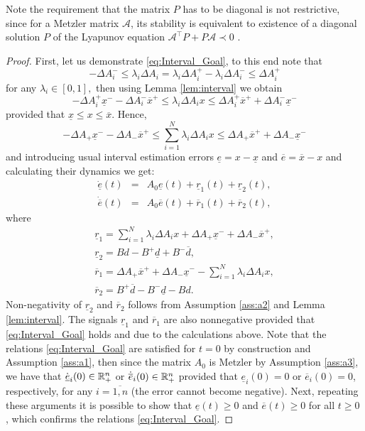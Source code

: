 \documentclass[letterpaper, 10 pt, conference]{ieeeconf}
\theoremstyle{plain}
\theoremstyle{definition}
\theoremstyle{plain}
\theoremstyle{plain}
\theoremstyle{remark}
\begin{document}
Note the requirement that the matrix $P$ has to be diagonal is not restrictive, since for a Metzler matrix $\mathcal{A}$, its stability is equivalent to existence of a diagonal solution $P$ of the Lyapunov equation $\mathcal{A}^{\top}P+P\mathcal{A}\prec0$ \cite{FarinaRinaldi2000}.
\begin{proof}
First, let us demonstrate \eqref{eq:Interval_Goal}, to this end note that
\[
-\Delta A_{i}^{-}\leq\lambda_{i}\Delta A_{i}=\lambda_{i}\Delta A_{i}^{+}-\lambda_{i}\Delta A_{i}^{-}\leq\Delta A_{i}^{+}
\]
for any $\lambda_{i}\in[0,1],$ then using Lemma \ref{lem:interval} we obtain
\[
-\Delta A_{i}^{+}\underline{x}^{-}-\Delta A_{i}^{-}\overline{x}^{+}\leq\lambda_{i}\Delta A_{i}x\leq\Delta A_{i}^{+}\overline{x}^{+}+\Delta A_{i}^{-}\underline{x}^{-}
\]
provided that $\underline{x}\leq x\leq\overline{x}$. Hence,
\[
-\Delta A_{+}\underline{x}^{-}-\Delta A_{-}\overline{x}^{+}\leq\sum_{i=1}^{N}\lambda_{i}\Delta A_{i}x\leq\Delta A_{+}\overline{x}^{+}+\Delta A_{-}\underline{x}^{-}
\]
and introducing usual interval estimation errors $\underline{e}=x-\underline{x}$ and $\overline{e}=\overline{x}-x$ and calculating their dynamics we get:
\begin{eqnarray*}
\dot{\underline{e}}(t) & = & A_{0}\underline{e}(t)+\underline{r}_{1}(t)+\underline{r}_{2}(t),\\
\dot{\overline{e}}(t) & = & A_{0}\overline{e}(t)+\overline{r}_{1}(t)+\overline{r}_{2}(t),
\end{eqnarray*}
where
\begin{gather*}
\underline{r}_{1}=\sum_{i=1}^{N}\lambda_{i}\Delta A_{i}x+\Delta A_{+}\underline{x}^{-}+\Delta A_{-}\overline{x}^{+},\\
\underline{r}_{2}=Bd-B^{+}\underline{d}+B^{-}\overline{d},\\
\overline{r}_{1}=\Delta A_{+}\overline{x}^{+}+\Delta A_{-}\underline{x}^{-}-\sum_{i=1}^{N}\lambda_{i}\Delta A_{i}x,\\
\overline{r}_{2}=B^{+}\overline{d}-B^{-}\underline{d}-Bd.
\end{gather*}
Non-negativity of $\underline{r}_{2}$ and $\overline{r}_{2}$ follows from Assumption \ref{ass:a2} and Lemma \ref{lem:interval}. The signals $\underline{r}_{1}$ and $\overline{r}_{1}$ are also nonnegative provided that \eqref{eq:Interval_Goal} holds and due to the calculations above. Note that the relations \eqref{eq:Interval_Goal} are satisfied for $t=0$ by construction and Assumption \ref{ass:a1}, then since the matrix $A_{0}$ is Metzler by Assumption \ref{ass:a3}, we have that $\dot{\underline{e}}_{i}(0)\in\mathbb{R}_{+}^{n}$ or $\dot{\overline{e}}_{i}(0)\in\mathbb{R}_{+}^{n}$ provided that $\underline{e}_{i}(0)=0$ or $\overline{e}_{i}(0)=0$, respectively, for any $i=\overline{1,n}$ (the error cannot become negative). Next, repeating these arguments it is possible to show that $\underline{e}(t)\geq0$ and $\overline{e}(t)\geq0$ for all $t\geq0$ \cite{Smith95}, which confirms the relations \eqref{eq:Interval_Goal}.


\end{proof}
\end{document}

